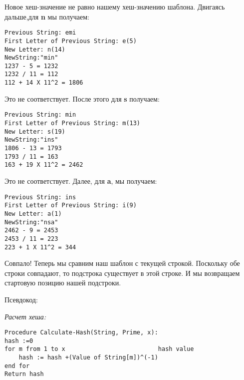 Новое хеш-значение не равно нашему хеш-значению шаблона. Двигаясь дальше,для \textbf{n} мы
получаем:
\vspace{\baselineskip}
\begin{tcolorbox}
\begin{verbatim}
Previous String: emi
First Letter of Previous String: e(5)
New Letter: n(14)
NewString:"min"
1237 - 5 = 1232
1232 / 11 = 112
112 + 14 X 11^2 = 1806
\end{verbatim}
\end{tcolorbox}
\vspace{\baselineskip}
Это не соответствует. После этого для \textbf{s} получаем:
\vspace{\baselineskip}
\begin{tcolorbox}
\begin{verbatim}
Previous String: min
First Letter of Previous String: m(13)
New Letter: s(19)
NewString:"ins"
1806 - 13 = 1793
1793 / 11 = 163
163 + 19 X 11^2 = 2462
\end{verbatim}
\end{tcolorbox}
\vspace{\baselineskip}
Это не соответствует. Далее, для \textbf{a}, мы получаем:
\vspace{\baselineskip}
\begin{tcolorbox}
\begin{verbatim}
Previous String: ins
First Letter of Previous String: i(9)
New Letter: a(1)
NewString:"nsa"
2462 - 9 = 2453
2453 / 11 = 223
223 + 1 X 11^2 = 344
\end{verbatim}
\end{tcolorbox}
\vspace{\baselineskip}
Совпало! Теперь мы сравним наш шаблон с текущей строкой. Поскольку обе строки
совпадают, то подстрока существует в этой строке. И мы возвращаем стартовую позицию
нашей подстроки.
\vspace{\baselineskip}

Псевдокод:
\vspace{\baselineskip}

\textit{Расчет хеша:}
\vspace{\baselineskip}
\begin{tcolorbox}
\begin{verbatim}
Procedure Calculate-Hash(String, Prime, x):
hash :=0        
for m from 1 to x						   hash value
	hash := hash +(Value of String[m])^(-1)
end for
Return hash
\end{verbatim}
\end{tcolorbox}
\vspace{\baselineskip}

